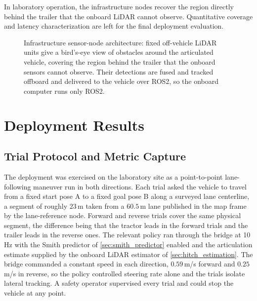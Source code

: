In laboratory operation, the infrastructure nodes recover the region directly behind the trailer that the onboard LiDAR cannot observe. Quantitative coverage and latency characterization are left for the final deployment evaluation.


\begin{figure}[H]
    \centering
    \resizebox{0.85\textwidth}{!}{}
    \caption{Infrastructure sensor-node architecture: fixed off-vehicle LiDAR units give a bird's-eye view of obstacles around the articulated vehicle, covering the region behind the trailer that the onboard sensors cannot observe. Their detections are fused and tracked offboard and delivered to the vehicle over ROS2, so the onboard computer runs only ROS2.}
    \label{fig:sensor_nodes}
\end{figure}

\section{Deployment Results}
\label{sec:deployment_results}

\subsection{Trial Protocol and Metric Capture}
\label{sec:deployment_protocol}

The deployment was exercised on the laboratory site as a point-to-point lane-following maneuver run in both directions. Each trial asked the vehicle to travel from a fixed start pose A to a fixed goal pose B along a surveyed lane centerline, a segment of roughly $23$\,m taken from a $60.5$\,m lane published in the map frame by the lane-reference node. Forward and reverse trials cover the same physical segment, the difference being that the tractor leads in the forward trials and the trailer leads in the reverse ones. The relevant policy ran through the bridge at 10\,Hz with the Smith predictor of \cref{sec:smith_predictor} enabled and the articulation estimate supplied by the onboard LiDAR estimator of \cref{sec:hitch_estimation}. The bridge commanded a constant speed in each direction, $0.59$\,m/s forward and $0.25$\,m/s in reverse, so the policy controlled steering rate alone and the trials isolate lateral tracking. A safety operator supervised every trial and could stop the vehicle at any point.

